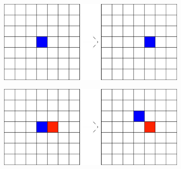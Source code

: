 \begin{figure}[H]
        \begin{subfigure}[T]{0.45\textwidth}
            \centering
            \includegraphics[width=\textwidth]{playground/1.png}
            \label{fig:playground_1}    
        \end{subfigure}
        \hfill
        \begin{subfigure}[T]{0.45\textwidth}
            \centering
            \includegraphics[width=\textwidth]{playground/2.png}
            \label{fig:playground_2}
        \end{subfigure}
\end{figure}

